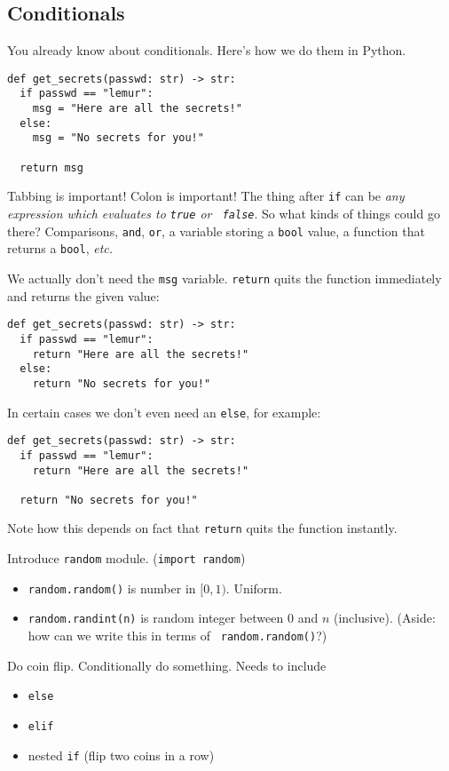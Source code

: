 \documentclass{article}
\newcommand{\etc}{\emph{etc.}\xspace}
\begin{document}
\subsection*{Conditionals}

You already know about conditionals.  Here's how we do them in Python.

\begin{verbatim}
def get_secrets(passwd: str) -> str:
  if passwd == "lemur":
    msg = "Here are all the secrets!"
  else:
    msg = "No secrets for you!"

  return msg
\end{verbatim}

Tabbing is important!  Colon is important!  The thing after {\tt if}
can be \emph{any expression which evaluates to {\tt true} or {\tt
    false}}.  So what kinds of things could go there?  Comparisons,
\verb|and|, \verb|or|, a variable storing a \verb|bool| value, a
function that returns a \verb|bool|, \etc

We actually don't need the \verb|msg| variable.  \verb|return| quits
the function immediately and returns the given value:

\begin{verbatim}
def get_secrets(passwd: str) -> str:
  if passwd == "lemur":
    return "Here are all the secrets!"
  else:
    return "No secrets for you!"
\end{verbatim}

In certain cases we don't even need an \verb|else|, for example:
\begin{verbatim}
def get_secrets(passwd: str) -> str:
  if passwd == "lemur":
    return "Here are all the secrets!"

  return "No secrets for you!"
\end{verbatim}
Note how this depends on fact that \verb|return| quits the function
instantly.

Introduce \verb|random| module. ({\tt import random})
\begin{itemize}
\item {\tt random.random()} is number in $[0,1)$. Uniform.
\item {\tt random.randint(n)} is random integer between $0$ and $n$
  (inclusive).  (Aside: how can we write this in terms of {\tt
    random.random()}?)
\end{itemize}
Do coin flip.  Conditionally do something.  Needs to include
\begin{itemize}
\item {\tt else}
\item {\tt elif}
\item nested {\tt if}  (flip two coins in a row)
\end{itemize}
\end{document}

